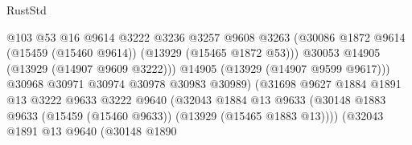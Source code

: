 \begin{lexlean}{RustStd}
\begin{coremodule}
                                              @103
                                              @53
                                              @16
                                              @9614
                                              @3222
                                              @3236
                                              @3257
                                              @9608
                                              @3263
                                              (@30086
                                                @1872
                                                @9614
                                                (@15459 (@15460 @9614))
                                                (@13929 (@15465 @1872 @53)))
                                              @30053
                                              @14905
                                              (@13929 (@14907 @9609 @3222)))
                                            @14905
                                            (@13929 (@14907 @9599 @9617)))
                                          @30968
                                          @30971
                                          @30974
                                          @30978
                                          @30983
                                          @30989)
                                        (@31698
                                          @9627
                                          @1884
                                          @1891
                                          @13
                                          @3222
                                          @9633
                                          @3222
                                          @9640
                                          (@32043
                                            @1884
                                            @13
                                            @9633
                                            (@30148
                                              @1883
                                              @9633
                                              (@15459 (@15460 @9633))
                                              (@13929 (@15465 @1883 @13))))
                                          (@32043
                                            @1891
                                            @13
                                            @9640
                                            (@30148
                                              @1890

\end{coremodule}
\end{lexlean}
